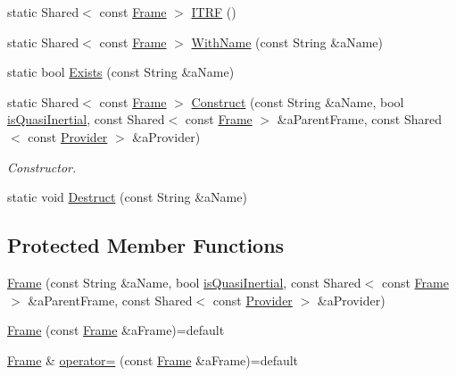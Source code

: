 \begin{DoxyCompactItemize}
\item 
static Shared$<$ const \hyperlink{classostk_1_1physics_1_1coord_1_1_frame}{Frame} $>$ \hyperlink{classostk_1_1physics_1_1coord_1_1_frame_ac1d0d50dc15982fbef3caba62a9ed507}{I\+T\+RF} ()
\item 
static Shared$<$ const \hyperlink{classostk_1_1physics_1_1coord_1_1_frame}{Frame} $>$ \hyperlink{classostk_1_1physics_1_1coord_1_1_frame_ad9f12f000a68daaec4969ba739f43ee7}{With\+Name} (const String \&a\+Name)
\item 
static bool \hyperlink{classostk_1_1physics_1_1coord_1_1_frame_afe14b695035c704b408563a12a47eb38}{Exists} (const String \&a\+Name)
\item 
static Shared$<$ const \hyperlink{classostk_1_1physics_1_1coord_1_1_frame}{Frame} $>$ \hyperlink{classostk_1_1physics_1_1coord_1_1_frame_a6faa8908c55e5e56ce3ed4c96d15b9af}{Construct} (const String \&a\+Name, bool \hyperlink{classostk_1_1physics_1_1coord_1_1_frame_ac0f7d78be14f09ccef5b862c4f963da8}{is\+Quasi\+Inertial}, const Shared$<$ const \hyperlink{classostk_1_1physics_1_1coord_1_1_frame}{Frame} $>$ \&a\+Parent\+Frame, const Shared$<$ const \hyperlink{classostk_1_1physics_1_1coord_1_1frame_1_1_provider}{Provider} $>$ \&a\+Provider)
\begin{DoxyCompactList}\small\item\em Constructor. \end{DoxyCompactList}\item 
static void \hyperlink{classostk_1_1physics_1_1coord_1_1_frame_a2c4bf16207b59862deaeee224153b8f9}{Destruct} (const String \&a\+Name)
\end{DoxyCompactItemize}
\subsection*{Protected Member Functions}
\begin{DoxyCompactItemize}
\item 
\hyperlink{classostk_1_1physics_1_1coord_1_1_frame_a66f32d0c9dd2497b6e7ace4fcccbce60}{Frame} (const String \&a\+Name, bool \hyperlink{classostk_1_1physics_1_1coord_1_1_frame_ac0f7d78be14f09ccef5b862c4f963da8}{is\+Quasi\+Inertial}, const Shared$<$ const \hyperlink{classostk_1_1physics_1_1coord_1_1_frame}{Frame} $>$ \&a\+Parent\+Frame, const Shared$<$ const \hyperlink{classostk_1_1physics_1_1coord_1_1frame_1_1_provider}{Provider} $>$ \&a\+Provider)
\item 
\hyperlink{classostk_1_1physics_1_1coord_1_1_frame_acaa7ddfcad1566838ca72bf431a3bd4f}{Frame} (const \hyperlink{classostk_1_1physics_1_1coord_1_1_frame}{Frame} \&a\+Frame)=default
\item 
\hyperlink{classostk_1_1physics_1_1coord_1_1_frame}{Frame} \& \hyperlink{classostk_1_1physics_1_1coord_1_1_frame_ac47e4fe942c8cd0b8969ee9f6d32b816}{operator=} (const \hyperlink{classostk_1_1physics_1_1coord_1_1_frame}{Frame} \&a\+Frame)=default
\end{DoxyCompactItemize}
